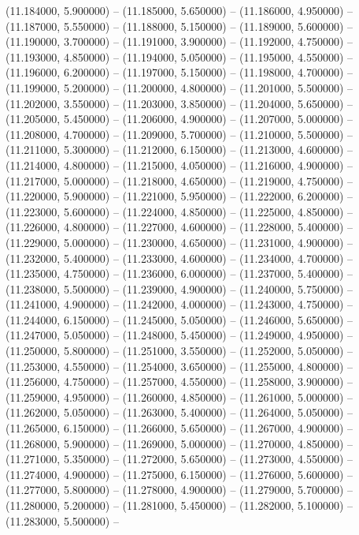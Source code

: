(11.184000, 5.900000) -- 
(11.185000, 5.650000) -- 
(11.186000, 4.950000) -- 
(11.187000, 5.550000) -- 
(11.188000, 5.150000) -- 
(11.189000, 5.600000) -- 
(11.190000, 3.700000) -- 
(11.191000, 3.900000) -- 
(11.192000, 4.750000) -- 
(11.193000, 4.850000) -- 
(11.194000, 5.050000) -- 
(11.195000, 4.550000) -- 
(11.196000, 6.200000) -- 
(11.197000, 5.150000) -- 
(11.198000, 4.700000) -- 
(11.199000, 5.200000) -- 
(11.200000, 4.800000) -- 
(11.201000, 5.500000) -- 
(11.202000, 3.550000) -- 
(11.203000, 3.850000) -- 
(11.204000, 5.650000) -- 
(11.205000, 5.450000) -- 
(11.206000, 4.900000) -- 
(11.207000, 5.000000) -- 
(11.208000, 4.700000) -- 
(11.209000, 5.700000) -- 
(11.210000, 5.500000) -- 
(11.211000, 5.300000) -- 
(11.212000, 6.150000) -- 
(11.213000, 4.600000) -- 
(11.214000, 4.800000) -- 
(11.215000, 4.050000) -- 
(11.216000, 4.900000) -- 
(11.217000, 5.000000) -- 
(11.218000, 4.650000) -- 
(11.219000, 4.750000) -- 
(11.220000, 5.900000) -- 
(11.221000, 5.950000) -- 
(11.222000, 6.200000) -- 
(11.223000, 5.600000) -- 
(11.224000, 4.850000) -- 
(11.225000, 4.850000) -- 
(11.226000, 4.800000) -- 
(11.227000, 4.600000) -- 
(11.228000, 5.400000) -- 
(11.229000, 5.000000) -- 
(11.230000, 4.650000) -- 
(11.231000, 4.900000) -- 
(11.232000, 5.400000) -- 
(11.233000, 4.600000) -- 
(11.234000, 4.700000) -- 
(11.235000, 4.750000) -- 
(11.236000, 6.000000) -- 
(11.237000, 5.400000) -- 
(11.238000, 5.500000) -- 
(11.239000, 4.900000) -- 
(11.240000, 5.750000) -- 
(11.241000, 4.900000) -- 
(11.242000, 4.000000) -- 
(11.243000, 4.750000) -- 
(11.244000, 6.150000) -- 
(11.245000, 5.050000) -- 
(11.246000, 5.650000) -- 
(11.247000, 5.050000) -- 
(11.248000, 5.450000) -- 
(11.249000, 4.950000) -- 
(11.250000, 5.800000) -- 
(11.251000, 3.550000) -- 
(11.252000, 5.050000) -- 
(11.253000, 4.550000) -- 
(11.254000, 3.650000) -- 
(11.255000, 4.800000) -- 
(11.256000, 4.750000) -- 
(11.257000, 4.550000) -- 
(11.258000, 3.900000) -- 
(11.259000, 4.950000) -- 
(11.260000, 4.850000) -- 
(11.261000, 5.000000) -- 
(11.262000, 5.050000) -- 
(11.263000, 5.400000) -- 
(11.264000, 5.050000) -- 
(11.265000, 6.150000) -- 
(11.266000, 5.650000) -- 
(11.267000, 4.900000) -- 
(11.268000, 5.900000) -- 
(11.269000, 5.000000) -- 
(11.270000, 4.850000) -- 
(11.271000, 5.350000) -- 
(11.272000, 5.650000) -- 
(11.273000, 4.550000) -- 
(11.274000, 4.900000) -- 
(11.275000, 6.150000) -- 
(11.276000, 5.600000) -- 
(11.277000, 5.800000) -- 
(11.278000, 4.900000) -- 
(11.279000, 5.700000) -- 
(11.280000, 5.200000) -- 
(11.281000, 5.450000) -- 
(11.282000, 5.100000) -- 
(11.283000, 5.500000) -- 
